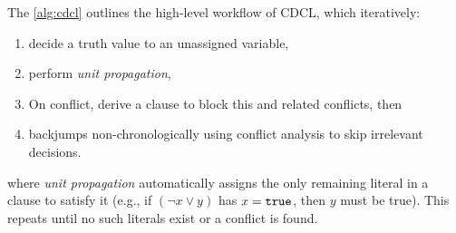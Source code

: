 The \cref{alg:cdcl} outlines the high-level workflow of CDCL, which iteratively:
\begin{enumerate}
    \item decide a truth value to an unassigned variable,
    \item perform \emph{unit propagation},
    \item On conflict, derive a clause to block this and related conflicts, then
    \item backjumps non-chronologically using conflict analysis to skip irrelevant decisions.
\end{enumerate}
where \emph{unit propagation} automatically assigns the only remaining literal in a clause to satisfy it (e.g., if $(\neg x \lor y)$ has $x = \texttt{\upshape{true}}$, then $y$ must be true).
This repeats until no such literals exist or a conflict is found.

